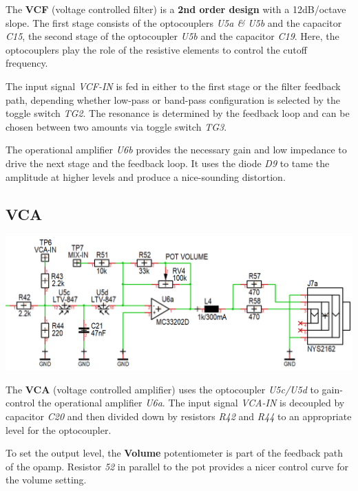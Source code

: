 \documentclass{scrartcl}
\begin{document}
The \textbf{VCF} (voltage controlled filter) is a \textbf{2nd order design} with a 12dB/octave slope. The first stage consists of the optocouplers \emph{U5a \& U5b} and the capacitor \emph{C15}, the second stage of the optocoupler \emph{U5b} and the capacitor \emph{C19}. Here, the optocouplers play the role of the resistive elements to control the cutoff frequency.

The input signal \emph{VCF-IN} is fed in either to the first stage or the filter feedback path, depending whether low-pass or band-pass configuration is selected by the toggle switch \emph{TG2}. The resonance is determined by the feedback loop and can be chosen between two amounts via toggle switch \emph{TG3}.

The operational amplifier \emph{U6b} provides the necessary gain and low impedance to drive the next stage and the feedback loop. It uses the diode \emph{D9} to tame the amplitude at higher levels and produce a nice-sounding distortion.

\pagebreak
\subsection{VCA}
\vspace{0.25cm}
\begin{center}
    \includegraphics[scale=0.40]{assets/schema-vca.png}
\end{center}

The \textbf{VCA} (voltage controlled amplifier) uses the optocoupler \emph{U5c/U5d} to gain-control the operational amplifier \emph{U6a}. The input signal \emph{VCA-IN} is decoupled by capacitor \emph{C20} and then divided down by resistors \emph{R42} and \emph{R44} to an appropriate level for the optocoupler.

To set the output level, the \textbf{Volume} potentiometer is part of the feedback path of the opamp. Resistor \emph{52} in parallel to the pot provides a nicer control curve for the volume setting.
\end{document}
